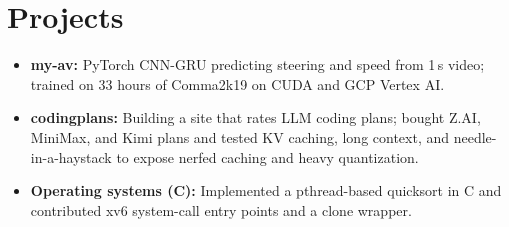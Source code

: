 \documentclass[11pt, letterpaper]{article}
\begin{document}
\section{Projects}
\begin{itemize}
  \item \textbf{my-av:} PyTorch CNN-GRU predicting steering and speed from 1\,s video; trained on 33 hours of Comma2k19 on CUDA and GCP Vertex AI.
  \item \textbf{codingplans:} Building a site that rates LLM coding plans; bought Z.AI, MiniMax, and Kimi plans and tested KV caching, long context, and needle-in-a-haystack to expose nerfed caching and heavy quantization.
  \item \textbf{Operating systems (C):} Implemented a pthread-based quicksort in C and contributed xv6 system-call entry points and a clone wrapper.
\end{itemize}
\end{document}

